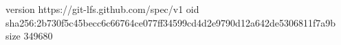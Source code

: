 version https://git-lfs.github.com/spec/v1
oid sha256:2b730f5c45becc6c66764ce077ff34599cd4d2e9790d12a642de5306811f7a9b
size 349680

